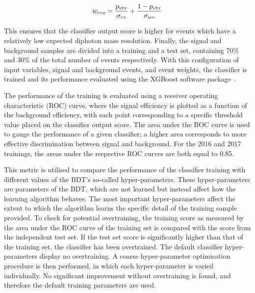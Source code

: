\begin{equation}
  w_{res} = \frac{p_{vtx}}{\sigma_{rv}} + \frac{1-p_{vtx}}{\sigma_{wv}}
\end{equation}

This ensures that the classifier output score is higher for events 
which have a relatively low expected diphoton mass resolution.
Finally, the signal and background samples are divided into a training and a test set,
containing 70\% and 30\% of the total number of events respectively.
With this configuration of input variables, signal and background events, and event weights, 
the classifier is trained and its performance evaluated using the XGBoost software package~\cite{XGBoost}.

The performance of the training is evaluated using a receiver operating characteristic (ROC) curve, 
where the signal efficiency is plotted as a function of the background efficiency,
with each point corresponding to a specific threshold value placed on the classifier output score.
The area under the ROC curve is used to gauge the performance of a given classifier; 
a higher area corresponds to more effective discrimination between signal and background.
For the 2016 and 2017 trainings, the areas under the respective ROC curves are both equal to 0.85.

This metric is utilised to compare the performance of the classifier training 
with different values of the BDT's so-called hyper-parameters.
These hyper-parameters are parameters of the BDT, 
which are not learned but instead affect how the learning algorithm behaves.
The most important hyper-parameters affect the extent to which 
the algorithm learns the specific detail of the training sample provided.
To check for potential overtraining, the training score as measured by the area under the ROC curve 
of the training set is compared with the score from the independent test set.
If the test set score is significantly higher than that of the training set, 
the classifier has been overtrained.
The default classifier hyper-parameters display no overtraining.
A coarse hyper-parameter optimisation procedure is then performed, 
in which each hyper-parameter is varied individually.
No significant improvement without overtraining is found, 
and therefore the default training parameters are used.

